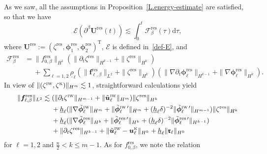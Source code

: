 \documentclass[11pt,leqno]{article}
\numberwithin{equation}{section}
\numberwithin{figure}{section}
\begin{document}
As we saw, all the assumptions in Proposition~\ref{L.energy-estimate} are satisfied, so that 
we have 
%
\[
\mathscr{E}(\partial^\beta \bm{U}^\mathrm{res}(t)) \lesssim 
 \int_0^t\mathscr{F}_\beta^\mathrm{res}(\tau)\mathrm{d}\tau,
\]
%
where $\bm{U}^\mathrm{res}:=(\zeta^\mathrm{res},\bm{\phi}_1^\mathrm{res},\bm{\phi}_2^\mathrm{res})^\mathrm{T}$, 
$\mathscr{E}$ is defined in~\eqref{def-E}, and 
%
\begin{align*}
\mathscr{F}_\beta^\mathrm{res}
&=  \|f_{0,\beta}^\mathrm{res}\|_{H^1}( \|\partial_t \zeta^\mathrm{res}\|_{H^{k-1}}
 + \|\zeta^\mathrm{res}\|_{H^k} ) \\
&\quad\;
 + \sum_{\ell=1,2}\underline{\rho}_\ell( \|\bm{f}_{\ell,\beta}^\mathrm{res}\|_{L^2} + \|\zeta^\mathrm{res}\|_{H^k} )
  ( \|\nabla\partial_t \bm{\phi}_\ell^\mathrm{res}\|_{H^{k-1}} + \|\nabla \bm{\phi}_\ell^\mathrm{res}\|_{H^k} ).
\end{align*}
%
In view of $\|(\zeta^{\mbox{\rm\tiny IW}},\zeta^{\mbox{\rm\tiny K}})\|_{H^m} \lesssim 1$, 
straightforward calculations yield 
%
\begin{align*}
\|\bm{f}_{\ell,\beta}^\mathrm{res}\|_{L^2}
&\lesssim
 (\|\partial_t\zeta^{\mbox{\rm\tiny IW}}\|_{H^{m-1}}+\|\tilde{\bm{u}}_\ell^{\mbox{\rm\tiny IW}}\|_{H^m})
  \|\zeta^\mathrm{res}\|_{H^k} \\
&\quad\;
 + \underline{h}_\ell(\|\nabla\tilde{\bm{\phi}}_\ell^{\mbox{\rm\tiny IW}}\|_{H^m}
  + \|\tilde{\bm{\phi}}_\ell^{\mbox{\rm\tiny IW} \, \prime}\|_{H^m}
  + (\underline{h}_\ell\delta)^{-2}\|\tilde{\bm{\phi}}_\ell^{\mbox{\rm\tiny IW} \, \prime}\|_{H^{m-1}})
  \|\zeta^\mathrm{res}\|_{H^k} \\
&\quad\;
  + \underline{h}_\ell(\|\nabla\tilde{\bm{\phi}}_\ell^\mathrm{res}\|_{H^k}
  + \|\tilde{\bm{\phi}}_\ell^{\mathrm{res} \, \prime}\|_{H^k}
  + (\underline{h}_\ell\delta)^{-2}\|\tilde{\bm{\phi}}_\ell^{\mathrm{res} \, \prime}\|_{H^{k-1}}) \\
&\quad\;
 + \|\partial_t\zeta^\mathrm{res}\|_{H^{k-1}}
 + \|\tilde{\bm{u}}_\ell^{\mbox{\rm\tiny IW}}-\bm{u}_\ell^{\mbox{\rm\tiny K}}\|_{H^k}
 + \underline{h}_\ell\|\bm{\mathfrak{r}}_\ell\|_{H^k}
\end{align*}
%
for $\ell=1,2$ and $\frac{n}{2}<k\leq m-1$. 
As for $f_{0,\beta}^\mathrm{res}$, we note the relation 
%
\end{document}
